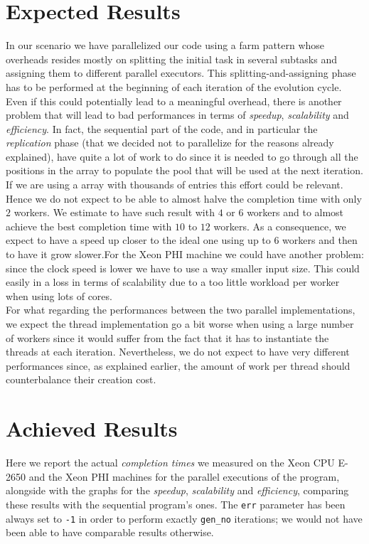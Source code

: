 \documentclass[10pt]{article}
\numberwithin{equation}{section}
\begin{document}
\section{Expected Results}
In our scenario we have parallelized our code using a farm pattern whose overheads resides mostly on splitting the initial task in several subtasks and assigning them to different parallel executors. This splitting-and-assigning phase has to be performed at the beginning of each iteration of the evolution cycle. Even if this could potentially lead to a meaningful overhead, there is another problem that will lead to bad performances in terms of \emph{speedup}, \emph{scalability} and \emph{efficiency}. In fact, the sequential part of the code, and in particular the \emph{replication} phase (that we decided not to parallelize for the reasons already explained), have quite a lot of work to do since it is needed to go through all the positions in the array to populate the pool that will be used at the next iteration. If we are using a array with thousands of entries this effort could be relevant. Hence we do not expect to be able to almost halve the completion time with only $2$ workers. We estimate to have such result with $4$ or $6$ workers and to almost achieve the best completion time with $10$ to $12$ workers. As a consequence, we expect to have a speed up closer to the ideal one using up to $6$ workers and then to have it grow slower.For the Xeon PHI machine we could have another problem: since the clock speed is lower we have to use a way smaller input size. This could easily in a loss in terms of scalability due to a too little workload per worker when using lots of cores.\\
For what regarding the performances between the two parallel implementations, we expect the thread implementation go a bit worse when using a large number of workers since it would suffer from the fact that it has to instantiate the threads at each iteration. Nevertheless, we do not expect to have very different performances since, as explained earlier, the amount of work per thread should counterbalance their creation cost.

\section{Achieved Results}
Here we report the actual \emph{completion times} we measured on the Xeon CPU E-2650 and the Xeon PHI machines for the parallel executions of the program, alongside with the graphs for the \emph{speedup}, \emph{scalability} and \emph{efficiency}, comparing these results with the sequential program's ones. The \verb|err| parameter has been always set to \verb|-1| in order to perform exactly \verb|gen_no| iterations; we would not have been able to have comparable results otherwise.
\end{document}
